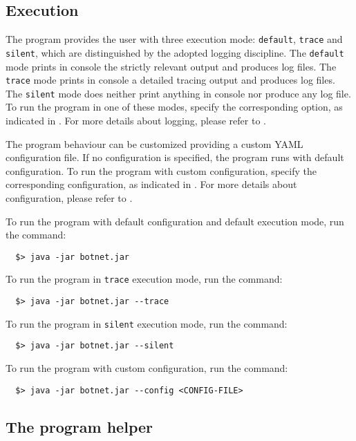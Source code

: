 \subsection{Execution}
\label{sec:execution}

The program provides the user with three execution mode: \texttt{default}, \texttt{trace} and \texttt{silent}, which are distinguished by the adopted logging discipline. The \texttt{default} mode prints in console the strictly relevant output and produces log files. The \texttt{trace} mode prints in console a detailed tracing output and produces log files. The \texttt{silent} mode does neither print anything in console nor produce any log file.
To run the program in one of these modes, specify the corresponding option, as indicated in .
For more details about logging, please refer to .

The program behaviour can be customized providing a custom YAML configuration file. If no configuration is specified, the program runs with default configuration. To run the program with custom configuration, specify the corresponding configuration, as indicated in . For more details about configuration, please refer to .

To run the program with default configuration and default execution mode, run the command:

\begin{verbatim}
  $> java -jar botnet.jar
\end{verbatim}

To run the program in \texttt{trace} execution mode, run the command:

\begin{verbatim}
  $> java -jar botnet.jar --trace
\end{verbatim}

To run the program in \texttt{silent} execution mode, run the command:

\begin{verbatim}
  $> java -jar botnet.jar --silent
\end{verbatim}

To run the program with custom configuration, run the command:

\begin{verbatim}
  $> java -jar botnet.jar --config <CONFIG-FILE>
\end{verbatim}

\subsection{The program helper}
\label{sec:helper}

